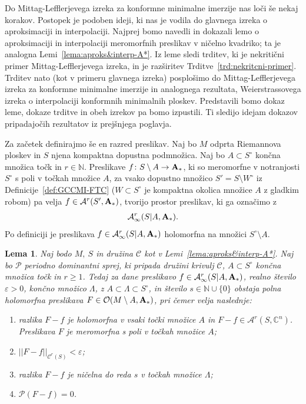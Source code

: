 \documentclass[12pt,a4paper,twoside]{article}
\theoremstyle{definition} %
\theoremstyle{plain} %
\newtheorem{lema}[definicija]{Lema}
\numberwithin{equation}{section}  %
\newcommand{\N}{\mathbb N}
\begin{document}
Do Mittag-Lefflerjevega izreka za konformne minimalne imerzije nas loči še nekaj korakov. Postopek je podoben ideji, ki nas je vodila do glavnega izreka o aproksimaciji in interpolaciji. Najprej bomo navedli in dokazali lemo o aproksimaciji in interpolaciji meromorfnih preslikav v ničelno kvadriko; ta je analogna Lemi~\ref{lema:aproks&interp-A*}.
Iz leme sledi trditev, ki je nekritični primer Mittag-Lefflerjevega izreka, in je razširitev Trditve~\ref{trd:nekritcni-primer}.
Trditev nato (kot v primeru glavnega izreka) posplošimo do Mittag-Lefflerjevega izreka za konformne minimalne imerzije in analognega rezultata, Weierstrassovega izreka o interpolaciji konformnih minimalnih ploskev.
Predstavili bomo dokaz leme, dokaze trditve in obeh izrekov pa bomo izpustili. Ti sledijo idejam dokazov pripadajočih rezultatov iz prejšnjega poglavja.

Za začetek definirajmo še en razred preslikav.
Naj bo $M$ odprta Riemannova ploskev in $S$ njena kompaktna dopustna podmnožica. Naj bo $A \subset S^{\circ}$ končna množica točk in $r \in \N$.
Preslikave $f \colon S \setminus A \to \textup{\textbf{A}}_{*}$, ki so meromorfne v notranjosti $S^{\circ}$ s poli v točkah množice $A$, za vsako dopustno množico $S' = S \setminus W^{\circ}$ iz Definicije~\ref{def:GCCMI-FTC} ($W \subset S^{\circ}$ je kompaktna okolica množice $A$ z gladkim robom) pa velja $f \in \mathcal{A}^{r}(S', \textup{\textbf{A}}_{*})$, tvorijo prostor preslikav, ki ga označimo z 
\begin{gather*}
\mathcal{A}_{\infty}^{r}(S|A, \textup{\textbf{A}}_{*}).
\end{gather*}
Po definiciji je preslikava $f \in \mathcal{A}_{\infty}^{r}(S|A, \textup{\textbf{A}}_{*})$ holomorfna na množici $S^{\circ} \setminus A$.

\begin{lema} \label{lema:ML-pomozna-lema}
Naj bodo $M, \ S$ in družina $\mathcal{C}$ kot v Lemi~\ref{lema:aproks&interp-A*}. Naj bo $\mathcal{P}$ periodno dominantni sprej, ki pripada družini krivulj $\mathcal{C}$, $A \subset S^{\circ}$ končna množica točk in $r \geq 1$.
Tedaj za dane preslikavo $f \in \mathcal{A}_{\infty}^{r}(S|A, \textup{\textbf{A}}_{*})$, realno število $\varepsilon > 0$, končno množico $\Lambda$, z $A \subset \Lambda \subset S^{\circ}$, in število $s \in \mathbb{N} \cup \{0\}$ obstaja polna holomorfna preslikava $F \in \mathcal{O}(M \setminus A, \textup{\textbf{A}}_{*})$, pri čemer velja naslednje:
\begin{enumerate}
\item razlika $F-f$ je holomorfna v vsaki točki množice $A$ in $F-f \in \mathcal{A}^{r}(S, \mathbb{C}^{n})$. Preslikava $F$ je meromorfna s poli v točkah množice $A$;
\item $ ||F-f||_{\mathcal{C}^{r}(S)} < \varepsilon$;
\item razlika $F-f$ je ničelna do reda $s$ v točkah množice $\Lambda$;
\item $\mathcal{P}(F-f) = 0$.
\end{enumerate}
\end{lema}
\end{document}
